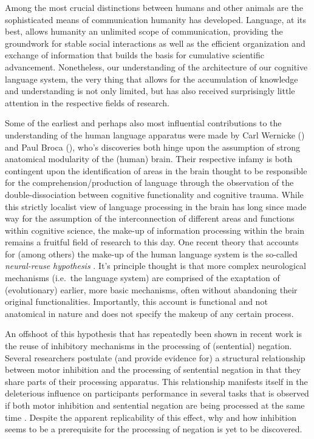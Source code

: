 Among the most crucial distinctions between humans and other animals are
the sophisticated means of communication humanity has developed. Language, at
its best, allows humanity an unlimited scope of communication, providing the
groundwork for stable social interactions as well as the efficient
organization and exchange of information that builds the basis for cumulative
scientific advancement.
Nonetheless, our understanding of the architecture of our cognitive language
system, the very thing that allows for the accumulation of knowledge and
understanding is not only limited, but has also received surprisingly little
attention in the respective fields of research.

Some of the earliest and perhaps also most influential contributions to the
understanding of the human language apparatus were made by Carl Wernicke
(\citeyear{wernicke_aphasische_1874}) and Paul Broca (\citeyear{broca_classics_1861}), who's
discoveries both hinge upon the assumption of strong anatomical modularity
of the (human) brain. Their respective infamy is both contingent upon the
identification of areas in the brain thought to be responsible for the
comprehension/production of language through the observation of the
double-dissociation between cognitive functionality
and cognitive trauma. While this strictly localist view of language processing
in the brain has long since  made way for the assumption of the interconnection
of different areas and functions within cognitive science, the make-up of
information processing within the brain remains a fruitful field of research
to this day.
One recent theory that accounts for (among others) the make-up of the human
language system is the so-called \textit{neural-reuse hypothesis}
\parencite[][]{anderson_neural_2010}.
It's principle thought is that more complex neurological mechanisms
(i.e.\ the language system) are comprised of the exaptation of (evolutionary)
earlier, more basic mechanisms, often without abandoning their original
functionalities. Importantly, this account is functional and not anatomical in
nature and does not specify the makeup of any certain process.

An offshoot of this hypothesis that has repeatedly been shown in recent work
is the reuse of inhibitory mechanisms in the processing of (sentential)
negation. Several researchers postulate (and provide evidence for) a
structural relationship
between motor inhibition and  the processing of sentential negation in that
they share parts of their processing apparatus. This relationship manifests
itself in the deleterious influence on participants performance in several
tasks that is observed if both motor inhibition and sentential negation are
being processed at the same time \parencite[see:][]{garcia-marco_negation_2019,
	aravena_grip_2012, de_vega_sentential_2016, montalti_is_2023,
	beltran_sentential_2018, beltran_brain_2019}.
Despite the apparent replicability of this effect,
why and how inhibition seems to be a prerequisite for the processing
of negation is yet to be discovered.\\

